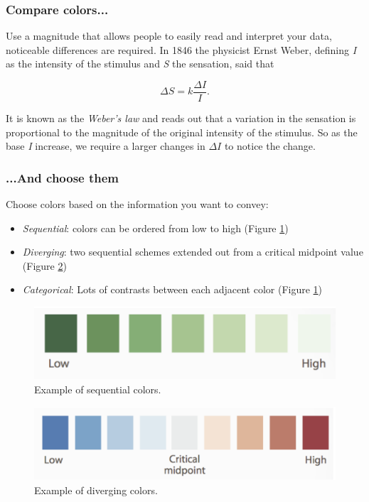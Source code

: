 \subsubsection*{Compare colors...}
Use a magnitude that allows people to easily read and interpret your data, noticeable differences are required. In 1846 the physicist Ernst Weber, defining \emph{I} as the intensity of the stimulus and \emph{S} the sensation, said that

$$\Delta S = k \frac{\Delta I}{I}.$$

It is known as the \emph{Weber's law} and reads out that a variation in the sensation is proportional to the magnitude of the original intensity of the stimulus. So as the base \emph{I} increase, we require a larger changes in  $\Delta I$ to notice the change. 

\subsubsection*{...And choose them}

Choose colors based on the information you want to convey:

\begin{itemize}
\item \emph{Sequential}: colors can be ordered from low to high (Figure \ref{pic:sequential})
\item \emph{Diverging}: two sequential schemes extended out from a critical midpoint value (Figure \ref{pic:diverging})
\item \emph{Categorical}: Lots of contrasts between each adjacent color (Figure \ref{pic:sequential})
\end{itemize}

\begin{figure}[H]%
 \centering
 \includegraphics[width=13cm]{./img/06/sequential}
 \caption{\label{pic:sequential} Example of sequential colors.}
\end{figure}


\begin{figure}[H]%
 \centering
 \includegraphics[width=13cm]{./img/06/diverging}
 \caption{\label{pic:diverging} Example of diverging colors.}
\end{figure}


